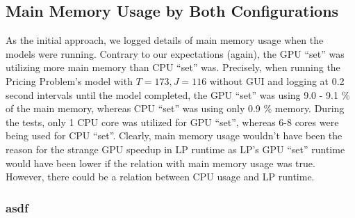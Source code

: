 \begin{appendices}
    \subsection{Main Memory Usage by Both Configurations}
    As the initial approach, we logged details of main memory usage when the models were running. Contrary to our expectations (again), the GPU ``set'' was utilizing more main memory than CPU ``set'' was. Precisely, when running the Pricing Problem's model with $T = 173, J = 116$ without GUI and logging at 0.2 second intervals until the model completed, the GPU ``set'' was using 9.0 - 9.1 \% of the main memory, whereas CPU ``set'' was using only 0.9 \% memory. During the tests, only 1 CPU core was utilized for GPU ``set'', whereas 6-8 cores were being used for CPU ``set''. Clearly, main memory usage wouldn't have been the reason for the strange GPU speedup in LP runtime as LP's GPU ``set'' runtime would have been lower if the relation with main memory usage was true. However, there could be a relation between CPU usage and LP runtime.
    
    \subsubsection{asdf}
\end{appendices}